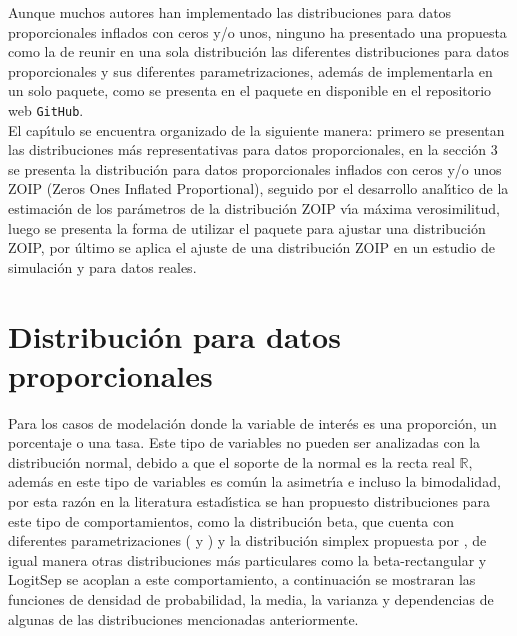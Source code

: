 Aunque muchos autores han implementado las distribuciones para datos proporcionales inflados con ceros y/o unos, ninguno ha presentado una propuesta como la de reunir en una sola distribuci\'{o}n las diferentes distribuciones para datos proporcionales y sus diferentes parametrizaciones, adem\'{a}s de implementarla en un solo paquete, como se presenta en el paquete  en \cite{R} disponible en el repositorio web \verb|GitHub|.\\

El cap\'{\i}tulo se encuentra organizado de la siguiente manera: primero se presentan las distribuciones m\'{a}s representativas para datos proporcionales, en la secci\'{o}n 3 se presenta la distribuci\'{o}n para datos proporcionales inflados con ceros y/o unos ZOIP (Zeros Ones Inflated Proportional), seguido por el desarrollo anal\'{\i}tico de la estimaci\'{o}n de los par\'{a}metros de la distribuci\'{o}n ZOIP v\'{\i}a m\'{a}xima verosimilitud, luego se presenta la forma de utilizar el paquete  para ajustar una distribuci\'{o}n ZOIP, por \'{u}ltimo se aplica el ajuste de una distribuci\'{o}n ZOIP en un estudio de simulaci\'{o}n y para datos reales.


\section{Distribuci\'{o}n para datos proporcionales} \label{Sec_dist_prop}

Para los casos de modelaci\'{o}n donde la variable de inter\'{e}s es una proporci\'{o}n, un porcentaje o una tasa. Este tipo de variables no pueden ser analizadas con la distribuci\'{o}n normal, debido a que el soporte de la normal es la recta real $\mathbb{R}$, adem\'{a}s en este tipo de variables es com\'{u}n la asimetr\'{\i}a e incluso la bimodalidad, por esta raz\'{o}n en la literatura estad\'{\i}stica se han propuesto distribuciones para este tipo de comportamientos, como la distribuci\'{o}n beta, que cuenta con diferentes parametrizaciones (\cite{Ferrari2} y \cite{Stasinopoulos2}) y la distribuci\'{o}n simplex propuesta por \cite{Barndorff1}, de igual manera otras distribuciones m\'{a}s particulares como la beta-rectangular \citep{Hahn1} y LogitSep \citep{Hossain1} se acoplan a este comportamiento, a continuaci\'{o}n se mostraran las funciones de densidad de probabilidad, la media, la varianza y dependencias de algunas de las distribuciones mencionadas anteriormente.


